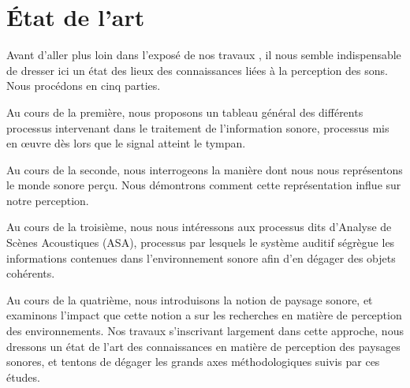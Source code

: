 \chapter{État de l'art}\label{ch:psycho_ea}


Avant d'aller plus loin dans l'exposé de nos travaux , il nous semble indispensable  de dresser ici un état des lieux des connaissances liées à la perception des sons. Nous procédons en cinq parties. 

Au cours de la première, nous proposons un tableau général des différents processus intervenant dans le traitement de l'information sonore, processus mis en œuvre dès lors que le signal atteint le tympan. 
 
Au cours de la seconde, nous interrogeons la manière dont nous nous représentons le monde sonore perçu. Nous démontrons comment cette représentation influe sur notre perception. 

Au cours de la troisième, nous nous intéressons aux processus dits d'Analyse de Scènes Acoustiques (ASA), processus par lesquels le système auditif ségrègue les informations contenues dans l'environnement sonore afin d'en dégager des objets cohérents. 

Au cours de la quatrième, nous introduisons la notion de paysage sonore, et examinons l'impact que cette notion a sur les recherches en matière de perception des environnements. Nos travaux s'inscrivant largement dans cette approche, nous dressons un état de l'art des connaissances en matière de perception des paysages sonores, et tentons de dégager les grands axes méthodologiques suivis par ces études.

